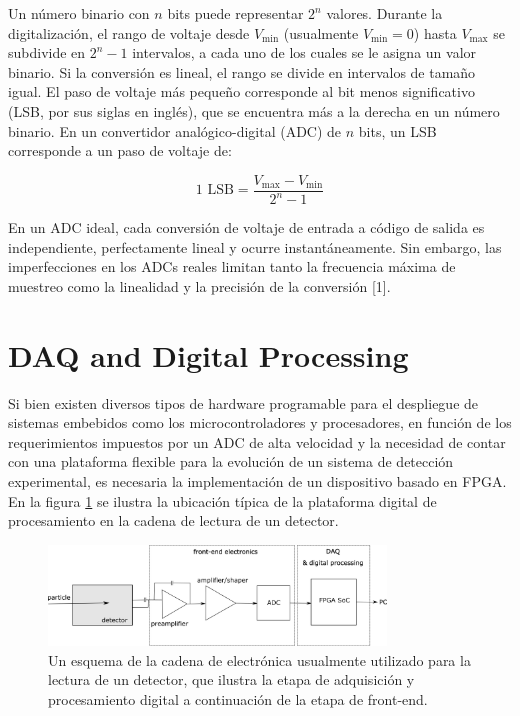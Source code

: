 \documentclass[]{book}
\begin{document}
\noindent Un número binario con $n$ bits puede representar $2^{n}$ valores. Durante la digitalización, el rango de voltaje desde $V_{\text{min}}$ (usualmente $V_{\text{min}} = 0$) hasta $V_{\text{max}}$ se subdivide en $2^{n} - 1$ intervalos, a cada uno de los cuales se le asigna un valor binario. Si la conversión es lineal, el rango se divide en intervalos de tamaño igual. El paso de voltaje más pequeño corresponde al bit menos significativo (LSB, por sus siglas en inglés), que se encuentra más a la derecha en un número binario. En un convertidor analógico-digital (ADC) de $n$ bits, un LSB corresponde a un paso de voltaje de:

$$
1 \text{ LSB} = \frac{V_{\text{max}} - V_{\text{min}}}{2^n - 1}
$$

\noindent En un ADC ideal, cada conversión de voltaje de entrada a código de salida es independiente, perfectamente lineal y ocurre instantáneamente. Sin embargo, las imperfecciones en los ADCs reales limitan tanto la frecuencia máxima de muestreo como la linealidad y la precisión de la conversión [1]. 


\section{DAQ and Digital Processing}

\noindent Si bien existen diversos tipos de hardware programable para el despliegue de sistemas embebidos como los microcontroladores y procesadores, en función de los requerimientos impuestos por un ADC de alta velocidad y la necesidad de contar con una plataforma flexible para la evolución de un sistema de detección experimental, es necesaria la implementación de un dispositivo basado en FPGA. En la figura \ref{fig:pulse_chain} se ilustra la ubicación típica de la plataforma digital de procesamiento en la cadena de lectura de un detector.

\begin{figure}[h]
    \centering
    \includegraphics[width=0.8\textwidth]{pulse_chain_generic.png}
    \caption{Un esquema de la cadena de electrónica usualmente utilizado para la lectura de un
    detector, que ilustra la etapa de adquisición y procesamiento digital a continuación de la etapa de front-end.}
    \label{fig:pulse_chain}

\end{figure}
\end{document}
